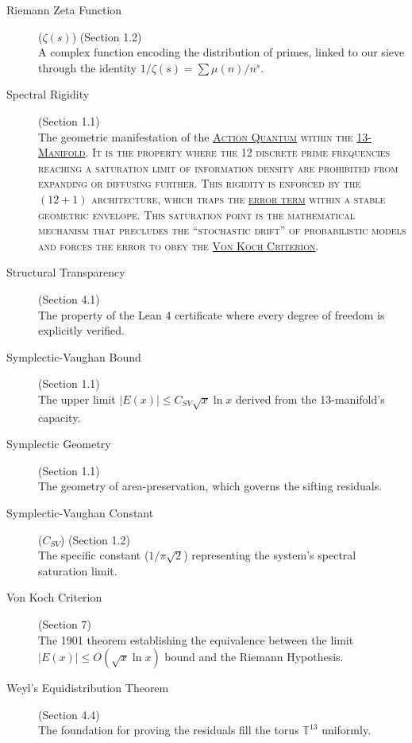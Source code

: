 \documentclass[sn-mathphys-num, pdflatex, referee]{sn-jnl}
\newcommand{\gterm}[2]{\begingroup\normalfont\scshape\hyperlink{#1}{#2}\endgroup}
\begin{document}
\begin{description}
    \item[Riemann Zeta Function] \hypertarget{zeta}{}\label{gloss:zeta} ($\zeta(s)$) (Section 1.2) \hfill \\
    A complex function encoding the distribution of primes, linked to our sieve through the identity $1/\zeta(s) = \sum \mu(n)/n^s$.

    \item[Spectral Rigidity] \hypertarget{spectral}{}\label{gloss:spectral} (Section 1.1) \hfill \\
    The geometric manifestation of the \gterm{action_quantum}{Action Quantum} within the \gterm{m13}{13-Manifold}. It is the property where the 12 discrete prime frequencies reaching a saturation limit of information density are prohibited from expanding or diffusing further. This rigidity is enforced by the $(12+1)$ architecture, which traps the \gterm{error_term}{error term} within a stable geometric envelope. This saturation point is the mathematical mechanism that precludes the ``stochastic drift'' of probabilistic models and forces the error to obey the \gterm{von_koch}{Von Koch Criterion}.

    \item[Structural Transparency] \hypertarget{structural_transparency}{}\label{gloss:transparency} (Section 4.1) \hfill \\
    The property of the Lean 4 certificate where every degree of freedom is explicitly verified.

    \item[Symplectic-Vaughan Bound] \hypertarget{sv_bound}{}\label{gloss:bound} (Section 1.1) \hfill \\
    The upper limit $|E(x)| \le C_{SV} \sqrt{x} \ln x$ derived from the 13-manifold's capacity.

    \item[Symplectic Geometry] \hypertarget{geometry}{}\label{gloss:geometry} (Section 1.1) \hfill \\
    The geometry of area-preservation, which governs the sifting residuals.

    \item[Symplectic-Vaughan Constant] \hypertarget{csv}{}\label{gloss:constant} ($C_{SV}$) (Section 1.2) \hfill \\
    The specific constant ($1/\pi\sqrt{2}$) representing the system's spectral saturation limit.

    \item[Von Koch Criterion] \hypertarget{von_koch}{}\label{gloss:vonkoch} (Section 7) \hfill \\
    The 1901 theorem establishing the equivalence between the limit $|E(x)| \le O(\sqrt{x} \ln x)$ bound and the Riemann Hypothesis.

    \item[Weyl's Equidistribution Theorem] \hypertarget{weyl}{}\label{gloss:weyl} (Section 4.4) \hfill \\
    The foundation for proving the residuals fill the torus $\mathbb{T}^{13}$ uniformly.
\end{description}
\end{document}

